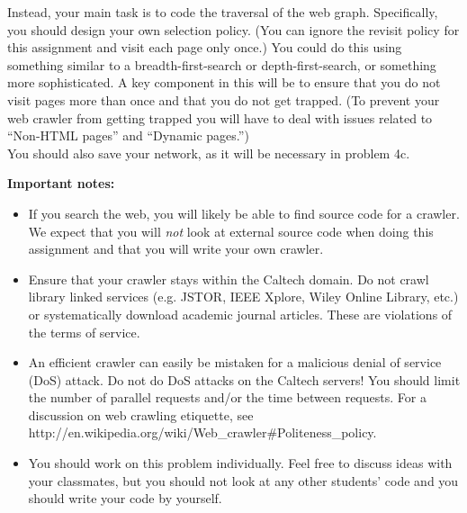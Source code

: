 \documentclass[11pt]{article}
\begin{document}
Instead, your main task is to code the traversal of the web graph.
Specifically, you should design your own selection policy.  (You can
ignore the revisit policy for this assignment and visit each page only
once.) You could do this using something similar to a
breadth-first-search or depth-first-search, or something more
sophisticated.  A key component in this will be to ensure that you do
not visit pages more than once and that you do not get trapped.  (To
prevent your web crawler from getting trapped you will have to deal
with issues related to ``Non-HTML pages'' and ``Dynamic pages.'') \\
You should also save your network, as it will be necessary in problem 4c. 

\noindent\textbf{Important notes:}

\begin{itemize}
\item If you search the web, you will likely be able to find source
code for a crawler.  We expect that you will \emph{not} look at
external source code when doing this assignment and that you will
write your own crawler.

\item Ensure that your crawler stays within the Caltech domain.
  Do not crawl library linked services (e.g. JSTOR, IEEE Xplore,
  Wiley Online Library, etc.) or systematically download academic
  journal articles. These are violations of the terms of service.

\item An efficient crawler can easily be mistaken for a malicious denial of service (DoS) attack. Do not do DoS attacks on the Caltech servers! You should limit the number of parallel requests and/or the time
  between requests. For a discussion on web crawling etiquette, see\\
  http://en.wikipedia.org/wiki/Web\_crawler\#Politeness\_policy.

\item You should work on this problem individually. Feel free to discuss ideas with your classmates, but you should not look at any other students' code and you should write your code by yourself.
\end{itemize}
\end{document}
